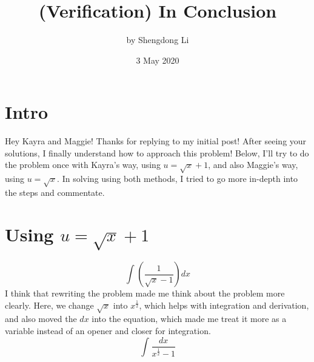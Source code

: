 \documentclass[letterpaper, 12pt]{article}
\begin{document}
\title{(Verification) In Conclusion}
\author{by Shengdong Li}
\date{3 May 2020}
\maketitle
\section{Intro}
Hey Kayra and Maggie! Thanks for replying to my initial post! After seeing your solutions, I finally understand how to approach this problem! Below, I'll try to do the problem once with Kayra's way, using $u=\sqrt{x}+1$, and also Maggie's way, using $u=\sqrt{x}$. In solving using both methods, I tried to go more in-depth into the steps and commentate. 
\section{Using $u=\sqrt{x}+1$}
\begin{equation}
    \int_{ }^{ }\left(\frac{1}{\sqrt{x}-1}\right)dx
\end{equation}
I think that rewriting the problem made me think about the problem more clearly. Here, we change $\sqrt{x}$ into $x^{\frac{1}{2}}$, which helps with integration and derivation, and also moved the $dx$ into the equation, which made me treat it more as a variable instead of an opener and closer for integration.
\begin{equation}
    \int_{ }^{ }\frac{dx}{x^{\frac{1}{2}}-1}
\end{equation}
\end{document}
